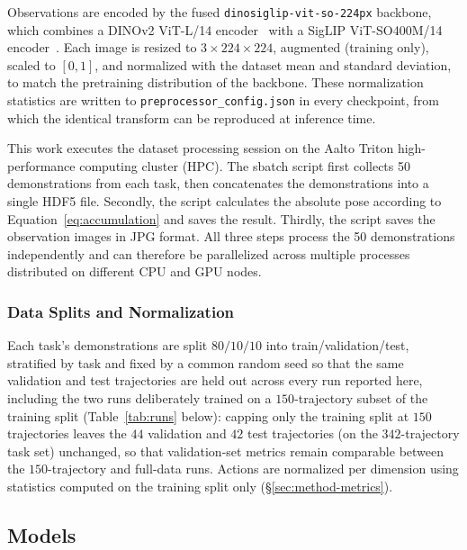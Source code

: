 \documentclass[english,12pt,a4paper,pdftex,elec,utf8]{aaltothesis}
\begin{document}
Observations are encoded by the fused \texttt{dinosiglip-vit-so-224px} backbone, which combines a DINOv2 ViT-L/14 encoder~\cite{oquab2024dinov2learningrobustvisual} with a SigLIP ViT-SO400M/14 encoder~\cite{zhai2023sigmoid}. Each image is resized to
$3\times224\times224$, augmented (training only), scaled to $[0,1]$, and normalized with the dataset mean and standard deviation, to match the pretraining distribution of the backbone. These normalization statistics are written to \texttt{preprocessor\_config.json} in every checkpoint, from which the identical transform can be reproduced at inference time.

This work executes the dataset processing session on the Aalto Triton high-performance computing cluster (HPC). The sbatch script first collects 50 demonstrations from each task, then concatenates the demonstrations into a single HDF5 file. Secondly, the script calculates the absolute pose according to Equation~\ref{eq:accumulation} and saves the result. Thirdly, the script saves the observation images in JPG format. All three steps process the 50 demonstrations independently and can therefore be parallelized across multiple processes distributed on different CPU and GPU nodes.


\subsubsection{Data Splits and Normalization}
\label{sec:implementation-data}

Each task's demonstrations are split $80/10/10$ into train/validation/test, stratified by task and fixed by a common random seed so that the same validation and test trajectories are held out across every run reported here, including the two runs deliberately trained on a $150$-trajectory subset of the training split (Table~\ref{tab:runs} below): capping only the training split at $150$ trajectories leaves the $44$ validation and $42$ test trajectories (on the $342$-trajectory task set) unchanged, so that validation-set metrics remain comparable between the $150$-trajectory and full-data
runs. Actions are normalized per dimension using statistics computed on the training split only (\S\ref{sec:method-metrics}).



\subsection{Models}
\label{sec:implementation-models}
\end{document}
